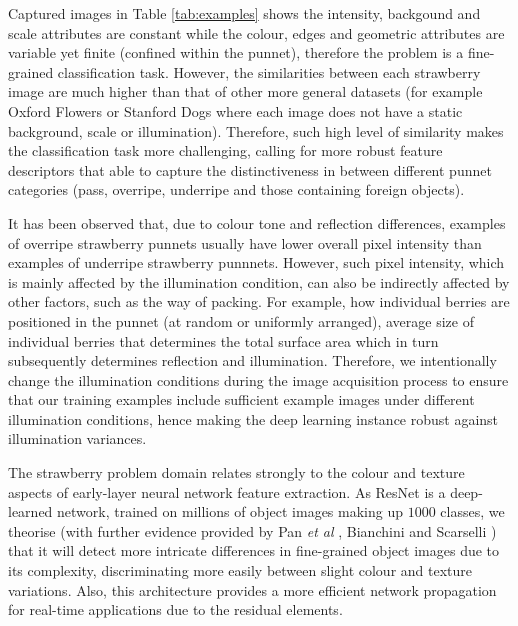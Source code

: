 \documentclass[conference]{IEEEtran}
\begin{document}
Captured images in Table \ref{tab:examples} shows the intensity, backgound and scale attributes are constant while the colour, edges and geometric attributes are variable yet finite (confined within the punnet), therefore the problem is a fine-grained classification task. However, the similarities between each strawberry image are much higher than that of other more general datasets (for example Oxford Flowers or Stanford Dogs where each image does not have a static background, scale or illumination). Therefore, such high level of similarity makes the classification task more challenging, calling for more robust feature descriptors that able to capture the distinctiveness in between different punnet categories (pass, overripe, underripe and those containing foreign objects).

It has been observed that, due to colour tone and reflection differences, examples of overripe strawberry punnets usually have lower overall pixel intensity than examples of underripe strawberry punnnets. However, such pixel intensity, which is mainly affected by the illumination condition, can also be indirectly affected by other factors, such as the way of packing. For example, how individual berries are positioned in the punnet (at random or uniformly arranged), average size of individual berries that determines the total surface area which in turn subsequently determines reflection and illumination. Therefore, we intentionally change the illumination conditions during the image acquisition process to ensure that our training examples include sufficient example images under different illumination conditions, hence making the deep learning instance robust against illumination variances.

The strawberry problem domain relates strongly to the colour and texture aspects of early-layer neural network feature extraction. As ResNet is a deep-learned network, trained on millions of object images making up $1000$ classes, we theorise (with further evidence provided by Pan {\it et al} \cite{pan}, Bianchini and Scarselli \cite{bianchini}) that it will detect more intricate differences in fine-grained object images due to its complexity, discriminating more easily between slight colour and texture variations. Also, this architecture provides a more efficient network propagation for real-time applications due to the residual elements.
\end{document}
